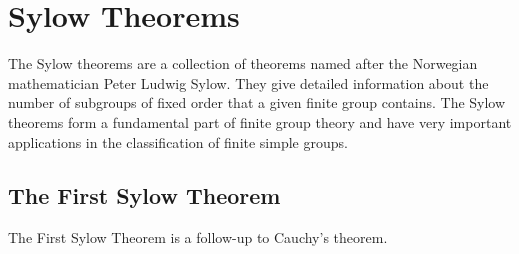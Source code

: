 \chapter{Sylow Theorems}
The Sylow theorems are a collection of theorems named after the Norwegian mathematician Peter Ludwig Sylow. They give detailed information about the number of subgroups of fixed order that a given finite group contains. The Sylow theorems form a fundamental part of finite group theory and have very important applications in the classification of finite simple groups.

\section{The First Sylow Theorem}
The First Sylow Theorem is a follow-up to Cauchy's theorem.

